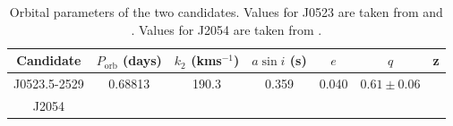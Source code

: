 \begin{table}[H]
    \centering
    \begin{tabular}{c|cccccc}
        \hline
        Candidate & $P_{\text{orb}}$ (days) & $k_2$ (kms$^{-1}$) & $a \sin i$ (s) & $e$ & $q$ & z\\
        \hline
        J0523.5-2529 & 0.68813 & 190.3 & 0.359 & 0.040 & $0.61 \pm 0.06$ & \\
        J2054 &  &  & & & & \\
        \hline \hline 
    \end{tabular}
    \caption{Orbital parameters of the two candidates. Values for J0523 are taken from \cite{strader_1fgl_2014} and \cite{halpern_luminous_2022}. Values for J2054 are taken from \cite{karpova_new_2023}.}
    \label{tab:orbital-parameters}
\end{table}

